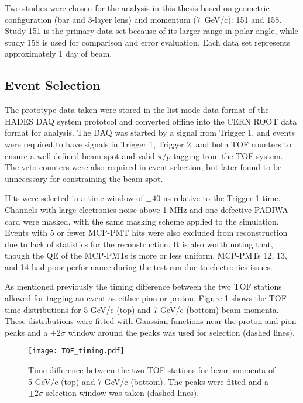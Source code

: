 Two studies were chosen for the analysis in this thesis based on geometric configuration (bar and 3-layer lens) and momentum (7~GeV/c): 151 and 158. Study 151 is the primary data set because of its larger range in polar angle, while study 158 is used for comparison and error evaluation. Each data set represents approximately 1 day of beam.

\subsection{Event Selection}
The prototype data taken were stored in the list mode data format of the HADES DAQ system prototcol \cite{HADES_DAQ} and converted offline into the CERN ROOT data format \cite{ROOT} for analysis. The DAQ was started by a signal from Trigger 1, and events were required to have signals in Trigger 1, Trigger 2, and both TOF counters to ensure a well-defined beam spot and valid $\pi/p$ tagging from the TOF system. The veto counters were also required in event selection, but later found to be unnecessary for constraining the beam spot.

Hits were selected in a time window of $\pm 40$ ns relative to the Trigger 1 time. Channels with large electronics noise above 1 MHz and one defective PADIWA card were masked, with the same masking scheme applied to the simulation. Events with 5 or fewer MCP-PMT hits were also excluded from reconstruction due to lack of statistics for the reconstruction. It is also worth noting that, though the QE of the MCP-PMTs is more or less uniform, MCP-PMTs 12, 13, and 14 had poor performance during the test run due to electronics issues.

As mentioned previously the timing difference between the two TOF stations allowed for tagging an event as either pion or proton. Figure \ref{fig:tof_timing} shows the TOF time distributions for 5 GeV/c (top) and 7 GeV/c (bottom) beam momenta. These distributions were fitted with Gaussian functions near the proton and pion peaks and a $\pm2\sigma$ window around the peaks was used for selection (dashed lines).

\begin{figure}[!htb]
	\centering
	\texttt{[image: TOF\_timing.pdf]}
	\caption[Time difference between the two TOF stations for beam momenta of 5 GeV/c (top) and 7 GeV/c (bottom).]{Time difference between the two TOF stations for beam momenta of 5 GeV/c (top) and 7 GeV/c (bottom). The peaks were fitted and a $\pm2\sigma$ selection window was taken (dashed lines).}
	\label{fig:tof_timing}
\end{figure}

